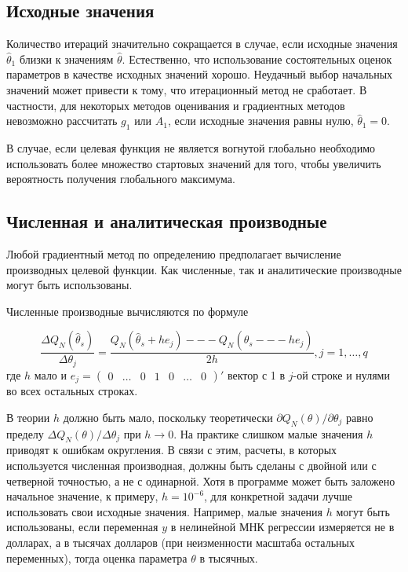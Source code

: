 \subsection{Исходные значения}

Количество итераций значительно сокращается в случае, если исходные значения $\hat{\theta}_1$ близки к значениям $\hat{\theta}$. Естественно, что использование состоятельных оценок  параметров  в качестве исходных значений хорошо. Неудачный выбор начальных значений может привести к тому, что  итерационный метод не сработает. В частности, для некоторых методов оценивания и градиентных методов невозможно рассчитать $g_1$ или $A_1$, если исходные значения равны нулю, $\hat{\theta}_1=0$.

В случае, если целевая функция не является вогнутой глобально необходимо использовать более множество стартовых значений для того, чтобы увеличить вероятность получения глобального максимума.

\subsection{Численная и аналитическая производные}

Любой градиентный метод по определению предполагает вычисление производных целевой функции. Как численные, так и аналитические производные могут быть использованы.

Численные производные вычисляются по формуле 

\begin{equation}
\dfrac{\Delta{Q_N}(\hat{\theta}_s)}{\Delta\theta_j} = \dfrac{Q_N(\hat{\theta}_s + he_j) --- Q_N(\hat{\theta}_s --- he_j)}{2h}, j = 1,\ldots,q
\end{equation}
где $h$ мало и $e_j = \begin{pmatrix} 0 &\ldots & 0 & 1 & 0 &\ldots & 0 \end{pmatrix}'$ вектор с 1 в $j$-ой строке и нулями во всех остальных строках.

В теории $h$ должно быть мало, поскольку теоретически $\partial{Q_N}(\theta)/\partial{\theta_j}$ равно пределу $\Delta{Q_N}(\theta)/\Delta\theta_j$ при $h \rightarrow 0$. На практике слишком малые значения $h$ приводят к ошибкам округления. В связи с этим, расчеты, в которых используется численная производная, должны быть сделаны с двойной или с четверной точностью, а не с одинарной. Хотя в программе может быть заложено начальное значение, к примеру, $h=10^{-6}$, для конкретной задачи лучше использовать свои исходные значения. Например, малые значения $h$ могут быть использованы, если переменная $y$ в нелинейной МНК регрессии измеряется не в долларах, а в тысячах долларов (при неизменности масштаба остальных переменных), тогда оценка параметра $\theta$ в тысячных.

